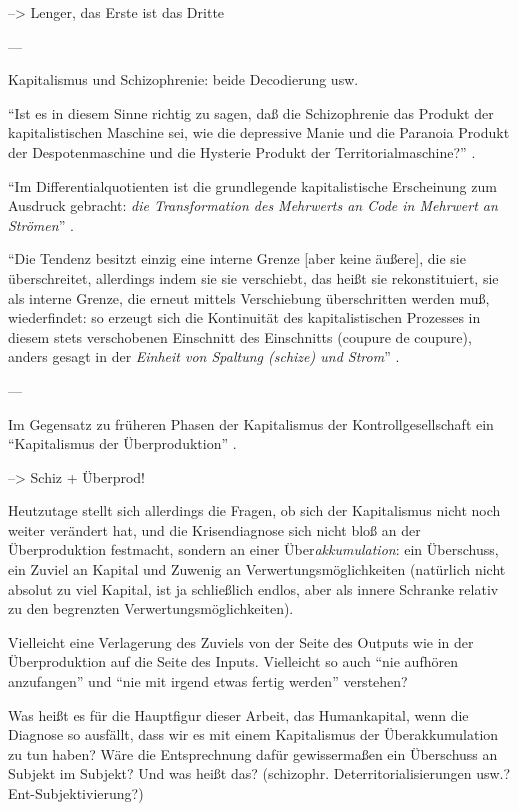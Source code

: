 \documentclass[12pt,
               DIV13,
               paper=a4,
               twoside=false,
               onehalfspacing,
               bibliography=totoc,
               toc=graduated,
               draft,
               ]{scrartcl}
\newcommand{\pc}[2]{\parencite[#1]{#2}}
\newcommand{\worries}[1]{\ifdraft{\textcolor{blue}{\texttt{(#1)}}}{}}
\begin{document}
--> Lenger, das Erste ist das Dritte

---

Kapitalismus und Schizophrenie: beide Decodierung usw.

"`Ist es in diesem Sinne richtig zu sagen, daß die Schizophrenie das
Produkt der kapitalistischen Maschine sei, wie die depressive Manie
und die Paranoia Produkt der Despotenmaschine und die Hysterie Produkt
der Territorialmaschine?"' \pc{44}{ao}.

"`Im Differentialquotienten ist die grundlegende kapitalistische
Erscheinung zum Ausdruck gebracht: \emph{die Transformation des
Mehrwerts an Code in Mehrwert an Strömen}"' \pc{S. 292 f.}{ao}.

"`Die Tendenz besitzt einzig eine interne Grenze [aber keine äußere],
die sie überschreitet, allerdings indem sie sie verschiebt, das heißt
sie rekonstituiert, sie als interne Grenze, die erneut mittels
Verschiebung überschritten \worries{Selbst-Überschreitung} werden muß,
wiederfindet: so erzeugt sich die Kontinuität des kapitalistischen
Prozesses in diesem stets verschobenen Einschnitt des Einschnitts
(coupure de coupure), anders gesagt in der \emph{Einheit von Spaltung
(schize) und Strom}"' \pc{S. 296, meine Hervorh.}{ao}.

---

Im Gegensatz zu früheren Phasen der Kapitalismus der
Kontrollgesellschaft ein "`Kapitalismus der Überproduktion"'
\pc{259}{ps}.

--> Schiz + Überprod!

Heutzutage stellt sich allerdings die Fragen, ob sich der Kapitalismus
nicht noch weiter verändert hat, und die Krisendiagnose sich nicht
bloß an der Überproduktion festmacht, sondern an einer
Über\emph{akkumulation}: ein Überschuss, ein Zuviel an Kapital und
Zuwenig an Verwertungsmöglichkeiten (natürlich nicht absolut zu viel
Kapital, ist ja schließlich endlos, aber als innere Schranke relativ
zu den begrenzten Verwertungsmöglichkeiten).

Vielleicht eine Verlagerung des Zuviels von der Seite des Outputs wie
in der Überproduktion auf die Seite des Inputs. Vielleicht so auch
"`nie aufhören anzufangen"' und "`nie mit irgend etwas fertig werden"'
verstehen?

Was heißt es für die Hauptfigur dieser Arbeit, das Humankapital, wenn
die Diagnose so ausfällt, dass wir es mit einem Kapitalismus der
Überakkumulation zu tun haben? Wäre die Entsprechnung dafür
gewissermaßen ein Überschuss an Subjekt im Subjekt? Und was heißt das?
(schizophr. Deterritorialisierungen usw.? Ent-Subjektivierung?)
\end{document}
